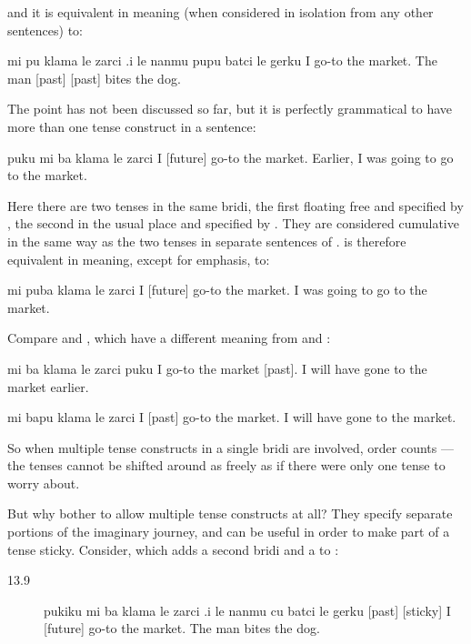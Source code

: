 {\noindent}and it is equivalent in meaning (when considered in isolation
    from any other sentences) to:
\begin{example}
mi pu klama le zarci\n
\T	.i le nanmu pupu batci le gerku\n
I  go-to the market.\n
\T	The man [past] [past] bites the dog.
\end{example}

The point has not been discussed so far, but it is perfectly
    grammatical to have more than one tense construct in a
    sentence:
\begin{example}
puku mi ba klama le zarci\n
{} I [future] go-to the market.\n
Earlier, I was going to go to the market.
\end{example}

Here there are two tenses in the same bridi, the first
    floating free and specified by , the second in the
    usual place and specified by . They are considered
    cumulative in the same way as the two tenses in separate
    sentences of .  is therefore equivalent in
    meaning, except for emphasis, to:
\begin{example}
mi puba klama le zarci\n
I  [future] go-to the market.\n
I was going to go to the market.
\end{example}

Compare  and , which have a different meaning
    from  and :
\begin{example}
mi ba klama le zarci puku\n
I  go-to the market [past].\n
I will have gone to the market earlier.
\end{example}

\begin{example}
mi bapu klama le zarci\n
I  [past] go-to the market.\n
I will have gone to the market.
\end{example}

So when multiple tense constructs in a single bridi are
    involved, order counts --- the tenses cannot be shifted around
    as freely as if there were only one tense to worry about.

But why bother to allow multiple tense constructs at all?
    They specify separate portions of the imaginary journey, and
    can be useful in order to make part of a tense sticky. Consider, which adds a second bridi
    and a  to :
\begin{description}
\item[13.9] pukiku mi ba klama le zarci .i le nanmu cu batci le gerku [past] [sticky] I [future] go-to the market. The man bites the dog.

\end{description}


